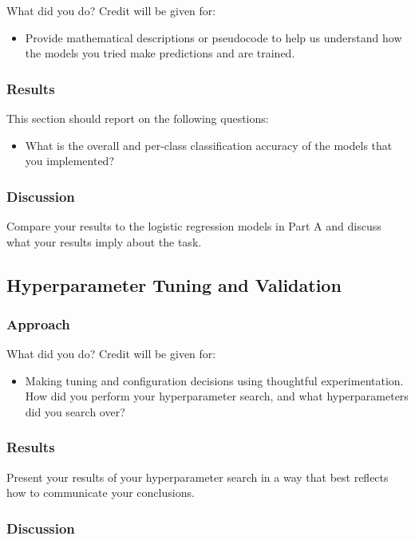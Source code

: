 \documentclass[11pt]{article}
\begin{document}
What did you do? Credit will be given for:

  \begin{itemize}
  \item Provide mathematical descriptions or pseudocode to help us understand how the models you tried make predictions and are trained.
  \end{itemize}

\subsubsection{Results}
This section should report on the following questions: 

\begin{itemize}
\item  What is the overall and per-class classification accuracy of the models that you implemented?
\end{itemize}


\subsubsection{Discussion}
Compare your results to the logistic regression models in Part A and discuss what your results imply about the task.


\subsection{Hyperparameter Tuning and Validation}

\subsubsection{Approach}
What did you do? Credit will be given for:

  \begin{itemize}
  \item Making tuning and configuration decisions using thoughtful experimentation.  
    How did you perform your hyperparameter search, and what hyperparameters did you search over?
  \end{itemize}

\subsubsection{Results}
Present your results of your hyperparameter search in a way that best reflects how to communicate your conclusions.

\subsubsection{Discussion}
\end{document}
